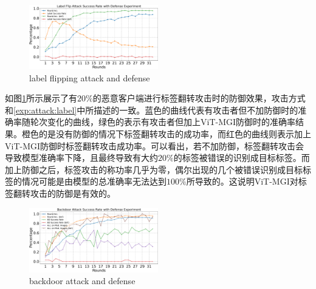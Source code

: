 \documentclass[conference]{IEEEtran}
\def\figLabelFlipDefense{0.5\textwidth}
\def\figBackdoorAttackDefense{0.5\textwidth}
\begin{document}
\begin{figure}[htbp]
    \centerline{\includegraphics[width=\figLabelFlipDefense]{pics/005-LabelFlippingAttack-withDefense.pdf}}
    \caption{label flipping attack and defense}
    \label{fig:labelFlipDefense}
\end{figure}

如图\hyperref[fig:labelFlipDefense]{\ref{fig:labelFlipDefense}}所示展示了有$20\%$的恶意客户端进行标签翻转攻击时的防御效果，攻击方式和\hyperref[exp:attack:label]{\ref{exp:attack:label}}中所描述的一致。蓝色的曲线代表有攻击者但不加防御时的准确率随轮次变化的曲线，绿色的表示有攻击者但加上ViT-MGI防御时的准确率结果。橙色的是没有防御的情况下标签翻转攻击的成功率，而红色的曲线则表示加上ViT-MGI防御时标签翻转攻击成功率。可以看出，若不加防御，标签翻转攻击会导致模型准确率下降，且最终导致有大约$20\%$的标签被错误的识别成目标标签。而加上防御之后，标签攻击的称功率几乎为零，偶尔出现的几个被错误识别成目标标签的情况可能是由模型的总准确率无法达到$100\%$所导致的。这说明ViT-MGI对标签翻转攻击的防御是有效的。

\begin{figure}[htbp]
    \centerline{\includegraphics[width=\figBackdoorAttackDefense]{pics/006-backdoorAttack-WithDefense.pdf}}
    \caption{backdoor attack and defense}
    \label{fig:backdoorAttackDefense}
\end{figure}
\end{document}
